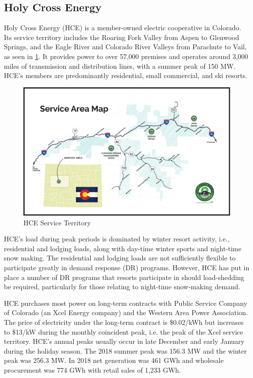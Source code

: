 \documentclass[12pt]{article}{Definitions/mdpi}
\begin{document}
\subsection{Holy Cross Energy}\label{sec:HCE_description}

Holy Cross Energy (HCE) is a member-owned electric cooperative in Colorado. Its service territory includes the Roaring Fork Valley from Aspen to Glenwood Springs, and the Eagle River and Colorado River Valleys from Parachute to Vail, as seen in \cref{fig:HCE_service_territory}. It provides power to over 57,000 premises and operates around 3,000 miles of transmission and distribution lines, with a summer peak of 150 MW. HCE's members are predominantly residential, small commercial, and ski resorts. 

\begin{figure}[t]
\centering
\includegraphics[scale=0.4]{HolyCrossEnergy-Service-Area-Map.png}
\caption{HCE Service Territory}
\label{fig:HCE_service_territory}
\end{figure}

HCE's load during peak periods is dominated by winter resort activity, i.e., residential and lodging loads, along with day-time winter sports and night-time snow making.  The residential and lodging loads are not sufficiently flexible to participate greatly in demand response (DR) programs. However, HCE has put in place a number of DR programs that resorts participate in should load-shedding be required, particularly for those relating to night-time snow-making demand.

HCE purchases most power on long-term contracts with Public Service Company of Colorado (an Xcel Energy company) and the Western Area Power Association. The price of electricity under the long-term contract is \$0.02/kWh but increases to \$13/kW during the monthly coincident peak, i.e. the peak of the Xcel service territory. HCE's annual peaks usually occur in late December and early January during the holiday season. The 2018 summer peak was 156.3 MW and the winter peak was 256.3 MW.  In 2018 net generation was 461 GWh and wholesale procurement was 774 GWh with retail sales of 1,233 GWh.
\end{document}
